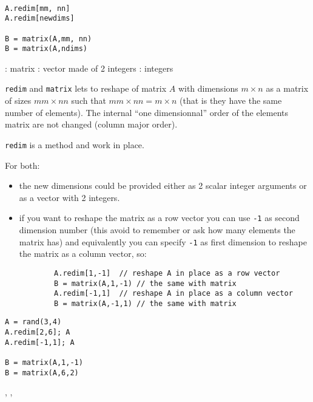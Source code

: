 
\begin{mandesc}
   \\
\end{mandesc}
\begin{calling_sequence}
\begin{verbatim}
A.redim[mm, nn]
A.redim[newdims]

B = matrix(A,mm, nn)
B = matrix(A,ndims)
\end{verbatim}
\end{calling_sequence}

\begin{parameters}
  \begin{varlist}
    : matrix
    :  vector made of 2 integers
    : integers
  \end{varlist}
\end{parameters}

\begin{mandescription}
\verb+redim+ and \verb+matrix+ lets to reshape of matrix $A$ with dimensions
$m \times n$ as a matrix of sizes $mm \times nn$ such that 
$mm \times nn = m \times n$ (that is they have the same number of elements).
The internal ``one dimensionnal'' order of the elements matrix are not changed
(column major order). 

\verb+redim+ is a method and work in place.

For both:
\begin{itemize}
  \item the new dimensions could be provided either as 2 scalar integer arguments or as a vector with 2 integers.
  \item if you want to reshape the matrix as a row vector you can use \verb+-1+ as second dimension number (this
        avoid to remember or ask how many elements the matrix has) and equivalently you can specify \verb+-1+ as 
        first dimension to reshape the matrix as a column vector, so:
        \begin{verbatim}
        A.redim[1,-1]  // reshape A in place as a row vector
        B = matrix(A,1,-1) // the same with matrix
        A.redim[-1,1]  // reshape A in place as a column vector
        B = matrix(A,-1,1) // the same with matrix
        \end{verbatim}
\end{itemize}

\end{mandescription}

\begin{examples}
\begin{Verbatim}
A = rand(3,4)
A.redim[2,6]; A
A.redim[-1,1]; A

B = matrix(A,1,-1)
B = matrix(A,6,2)
\end{Verbatim}
\end{examples}

\begin{manseealso}
   , ,  
\end{manseealso}

